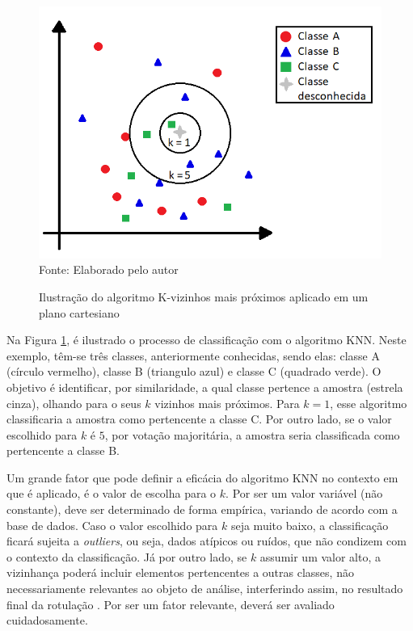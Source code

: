 \begin{figure}[ht!]
\caption{Ilustração do algoritmo K-vizinhos mais próximos aplicado em um plano cartesiano}
\label{fig:knnExample}
\centering
\includegraphics[scale=0.5]{img/knnExample.png}
{\fontsize{11pt}{\baselineskip}\selectfont
\\Fonte: Elaborado pelo autor
}
\end{figure}

Na Figura \ref{fig:knnExample}, é ilustrado o processo de classificação com o algoritmo KNN. Neste exemplo, têm-se três classes, anteriormente conhecidas, sendo elas: classe A (círculo vermelho), classe B (triangulo azul) e classe C (quadrado verde). O objetivo é identificar, por similaridade, a qual classe pertence a amostra (estrela cinza), olhando para o seus $k$ vizinhos mais próximos. Para $k = 1$, esse algoritmo classificaria a amostra como pertencente a classe C. Por outro lado, se o valor escolhido para $k$ é $5$, por votação majoritária, a amostra seria classificada como pertencente a classe B.

Um grande fator que pode definir a eficácia do algoritmo KNN no contexto em que é aplicado, é o valor de escolha para o $k$. Por ser um valor variável (não constante), deve ser determinado de forma empírica, variando de acordo com a base de dados. Caso o valor escolhido para $k$ seja muito baixo, a classificação ficará sujeita a \textit{outliers}, ou seja, dados atípicos ou ruídos, que não condizem com o contexto da classificação. Já por outro lado, se $k$ assumir um valor alto, a vizinhança poderá incluir elementos pertencentes a outras classes, não necessariamente relevantes ao objeto de análise, interferindo assim, no resultado final da rotulação \citep{fukunaga1975knn}. Por ser um fator relevante, deverá ser avaliado cuidadosamente.

